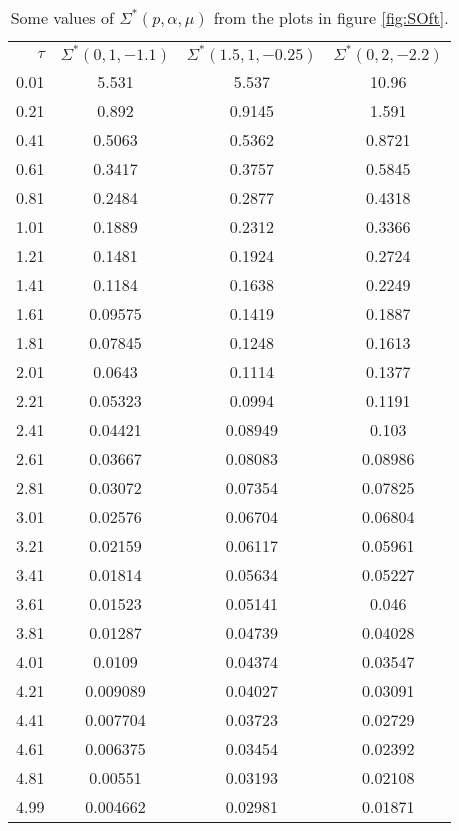 \begin{table}[H]
	\begin{center}
		\begin{tabular}{r | c | c | c} 
		 	$ \tau $ & $ \Sigma^*(0, 1, -1.1) $ & $ \Sigma^*(1.5, 1, -0.25) $ & $ \Sigma^*(0, 2, -2.2) $ \\ 
		 	\specialrule{.1em}{.05em}{.05em} 
0.01 & 5.531 & 5.537 & 10.96 \\
0.21 & 0.892 & 0.9145 & 1.591 \\
0.41 & 0.5063 & 0.5362 & 0.8721 \\
0.61 & 0.3417 & 0.3757 & 0.5845 \\
0.81 & 0.2484 & 0.2877 & 0.4318 \\
1.01 & 0.1889 & 0.2312 & 0.3366 \\
1.21 & 0.1481 & 0.1924 & 0.2724 \\
1.41 & 0.1184 & 0.1638 & 0.2249 \\
1.61 & 0.09575 & 0.1419 & 0.1887 \\
1.81 & 0.07845 & 0.1248 & 0.1613 \\
2.01 & 0.0643 & 0.1114 & 0.1377 \\
2.21 & 0.05323 & 0.0994 & 0.1191 \\
2.41 & 0.04421 & 0.08949 & 0.103 \\
2.61 & 0.03667 & 0.08083 & 0.08986 \\
2.81 & 0.03072 & 0.07354 & 0.07825 \\
3.01 & 0.02576 & 0.06704 & 0.06804 \\
3.21 & 0.02159 & 0.06117 & 0.05961 \\
3.41 & 0.01814 & 0.05634 & 0.05227 \\
3.61 & 0.01523 & 0.05141 & 0.046 \\
3.81 & 0.01287 & 0.04739 & 0.04028 \\
4.01 & 0.0109 & 0.04374 & 0.03547 \\
4.21 & 0.009089 & 0.04027 & 0.03091 \\
4.41 & 0.007704 & 0.03723 & 0.02729 \\
4.61 & 0.006375 & 0.03454 & 0.02392 \\
4.81 & 0.00551 & 0.03193 & 0.02108 \\
4.99 & 0.004662 & 0.02981 & 0.01871 \\
		\end{tabular}
	\end{center}
	\caption{Some values of $ \Sigma^*(p, \alpha, \mu) $ from the plots in figure \ref{fig:SOft}.}
	\label{tab:truthTablesS}   
\end{table}

